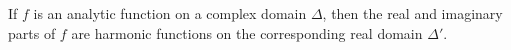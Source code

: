 If $f$ is an analytic function on a complex domain $\Delta$, then the real and imaginary parts of $f$ are harmonic functions on the corresponding real domain $\Delta'$.
